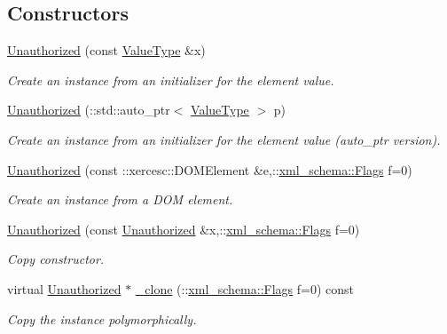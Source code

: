 \subsection*{Constructors}
\begin{DoxyCompactItemize}
\item 
\hyperlink{classopenstack_1_1xml_1_1Unauthorized_a2fe767dbe710c9da3d1c0f832c424599}{Unauthorized} (const \hyperlink{classopenstack_1_1xml_1_1UnauthorizedAPIFault}{ValueType} \&x)
\begin{DoxyCompactList}\small\item\em Create an instance from an initializer for the element value. \item\end{DoxyCompactList}\item 
\hyperlink{classopenstack_1_1xml_1_1Unauthorized_ad8b753a8f507c1f44397737d15d72ca3}{Unauthorized} (::std::auto\_\-ptr$<$ \hyperlink{classopenstack_1_1xml_1_1UnauthorizedAPIFault}{ValueType} $>$ p)
\begin{DoxyCompactList}\small\item\em Create an instance from an initializer for the element value (auto\_\-ptr version). \item\end{DoxyCompactList}\item 
\hyperlink{classopenstack_1_1xml_1_1Unauthorized_a27fcc3fc24351fb7d9991dd5fe435eed}{Unauthorized} (const ::xercesc::DOMElement \&e,::\hyperlink{namespacexml__schema_affb4c227cbd9aa7453dd1dc5a1401943}{xml\_\-schema::Flags} f=0)
\begin{DoxyCompactList}\small\item\em Create an instance from a DOM element. \item\end{DoxyCompactList}\item 
\hyperlink{classopenstack_1_1xml_1_1Unauthorized_a36e545191e48ae5316c2f05bee93447f}{Unauthorized} (const \hyperlink{classopenstack_1_1xml_1_1Unauthorized}{Unauthorized} \&x,::\hyperlink{namespacexml__schema_affb4c227cbd9aa7453dd1dc5a1401943}{xml\_\-schema::Flags} f=0)
\begin{DoxyCompactList}\small\item\em Copy constructor. \item\end{DoxyCompactList}\item 
virtual \hyperlink{classopenstack_1_1xml_1_1Unauthorized}{Unauthorized} $\ast$ \hyperlink{classopenstack_1_1xml_1_1Unauthorized_a562f2e26ab9792de7631a275cc1c9292}{\_\-clone} (::\hyperlink{namespacexml__schema_affb4c227cbd9aa7453dd1dc5a1401943}{xml\_\-schema::Flags} f=0) const 
\begin{DoxyCompactList}\small\item\em Copy the instance polymorphically. \item\end{DoxyCompactList}\end{DoxyCompactItemize}
